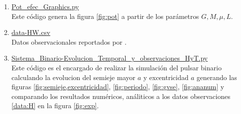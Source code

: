 \begin{enumerate}
    \item \href{https://github.com/giovannilopez9808/Notas_Agosto_2020/blob/master/RG/Proyecto_final/Documento/Scripts/Pot_efec_Graphics.py}{Pot\_efec\_Graphics.py\label{cod:potefe}}\\
    Este código genera la figura \ref{fig:pot} a partir de los parámetros $G,M,\mu,L$.
    \item \href{https://github.com/giovannilopez9808/Notas_Agosto_2020/blob/master/RG/Proyecto_final/Documento/Scripts/data-HW.csv}{data-HW.csv\label{data:H}}\\
    Datos observacionales reportados por \cite{Weisberg2010}.
    \item \href{https://github.com/giovannilopez9808/Notas_Agosto_2020/blob/master/RG/Proyecto_final/Documento/Scripts/Sistema_Binario-Evolucion_Temporal_y_observaciones_HyT.py}{Sistema\_Binario-Evolucion\_Temporal\_y\_observaciones\_HyT.py\label{cod:evo}}\\
    Este código es el encargado de realizar la simulación del pulsar binario calculando la evolucion del semieje mayor $a$ y excentricidad $a$ generando las figuras \ref{fig:semieje,excentricidad}, \ref{fig:periodo}, \ref{fig:gvse}, \ref{fig:ananum} y comparando los resultados numéricos, análiticos a los datos observaciones 
    \ref{data:H} en la figura \ref{fig:exp}.
\end{enumerate}